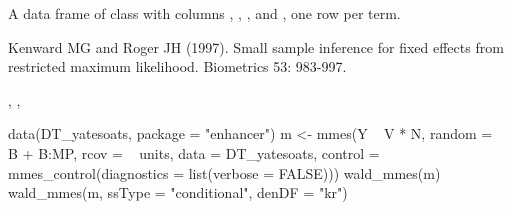 \documentclass[a4paper]{book}
\begin{document}
%
\begin{Value}
A data frame of class  with columns ,
, ,  and , one row per term.
\end{Value}
%
\begin{References}\relax
Kenward MG and Roger JH (1997). Small sample inference for fixed effects from
restricted maximum likelihood. Biometrics 53: 983-997.
\end{References}
%
\begin{SeeAlso}\relax
{}, , 
\end{SeeAlso}
%
\begin{Examples}
\begin{ExampleCode}
data(DT_yatesoats, package = "enhancer")
m <- mmes(Y ~ V * N,
  random = ~ B + B:MP,
  rcov = ~ units,
  data = DT_yatesoats,
  control = mmes_control(diagnostics = list(verbose = FALSE)))
wald_mmes(m)
wald_mmes(m, ssType = "conditional", denDF = "kr")
\end{ExampleCode}
\end{Examples}
\printindex{}
\end{document}
